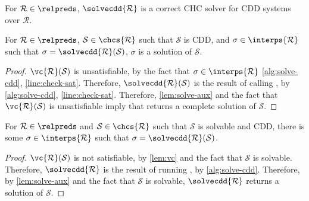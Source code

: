 For $\mathcal{R} \in \relpreds$, $\solvecdd{ \mathcal{R} }$ is a
correct CHC solver for CDD systems over $\mathcal{R}$.
%
\begin{lem}
  \label{lem:cdd-soln-sound}
  For $\mathcal{R} \in \relpreds$, %
  $\mathcal{S} \in \chcs{ \mathcal{R} }$ such that $\mathcal{S}$ is
  CDD, and %
  $\sigma \in \interps{ \mathcal{R} }$ such that %
  $\sigma = \solvecdd{ \mathcal{R} }(\mathcal{S})$, %
  $\sigma$ is a solution of $\mathcal{S}$.
\end{lem}
%
\begin{proof}
  $\vc{ \mathcal{R} }(\mathcal{S})$ is unsatisfiable, by the fact that
  $\sigma \in \interps{ \mathcal{R} }$ \autoref{alg:solve-cdd},
  \autoref{line:check-sat}.
  Therefore, $\solvecdd{ \mathcal{R} }(\mathcal{S})$ is the result of
  calling \solveaux, by \autoref{alg:solve-cdd},
  \autoref{line:check-sat}.
  Therefore, \autoref{lem:solve-aux} and the fact that $\vc{
    \mathcal{R} }(\mathcal{S})$ is unsatisfiable imply that \solveaux
  returns a complete solution of $\mathcal{S}$.
\end{proof}

\begin{lem}
  \label{lem:cdd-soln-complete}
  For $\mathcal{R} \in \relpreds$ and %
  $\mathcal{S} \in \chcs{ \mathcal{R} }$ such that $\mathcal{S}$ is
  solvable and CDD, %
  there is some $\sigma \in \interps{ \mathcal{R} }$ such that %
  $\sigma = \solvecdd{ \mathcal{R} }(\mathcal{S})$.
\end{lem}
%
\begin{proof}
  $\vc{ \mathcal{R} }(\mathcal{S})$ is not satisfiable, by
  \autoref{lem:vc} and the fact that $\mathcal{S}$ is solvable.
  Therefore, $\solvecdd{ \mathcal{R} }$ is the result of running
  \solveaux, by \autoref{alg:solve-cdd}.
  Therefore, by \autoref{lem:solve-aux} and the fact that
  $\mathcal{S}$ is solvable, $\solvecdd{ \mathcal{R} }$ returns a
  solution of $\mathcal{S}$.
\end{proof}

